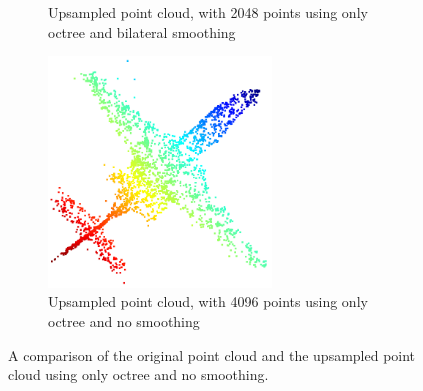 \begin{figure}[h]
\begin{subfigure}{0.3\textwidth}
		\caption{Upsampled point cloud, with 2048 points using only octree and bilateral smoothing}
	\end{subfigure}
	\begin{subfigure}{0.3\textwidth}
		\centering
		\includegraphics[width=0.65\textwidth]{./4096_octree_bilateral.png}
		\caption{Upsampled point cloud, with 4096 points using only octree and no smoothing}
	\end{subfigure}	
	\caption{A comparison of the original point cloud and the upsampled point cloud using only octree and no smoothing.}
	\label{fig:no_smoothing}
\end{figure}
